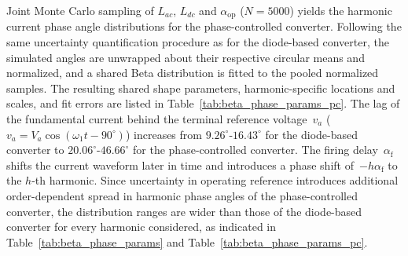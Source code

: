 Joint Monte Carlo sampling of $L_{ac}$, $L_{dc}$ and $\alpha_{\text{op}}$ ($N = 5000$) yields the harmonic current phase angle distributions for the phase-controlled converter. Following the same uncertainty quantification procedure as for the diode-based converter, the simulated angles are unwrapped about their respective circular means and normalized, and a shared Beta distribution is fitted to the pooled normalized samples. The resulting shared shape parameters, harmonic-specific locations and scales, and fit errors are listed in Table~\ref{tab:beta_phase_params_pc}.
The lag of the fundamental current behind the terminal reference voltage~$v_a$ ($v_a = V_a\cos(\omega_1 t - 90^{\circ})$) increases from $9.26^{\circ}$-$16.43^{\circ}$ for the diode-based converter to $20.06^{\circ}$-$46.66^{\circ}$ for the phase-controlled converter. The firing delay~$\alpha_{\text{f}}$ shifts the current waveform later in time and introduces a phase shift of~$-h\alpha_{\text{f}}$ to the $h$-th harmonic. Since uncertainty in operating reference introduces additional order-dependent spread in harmonic phase angles of the phase-controlled converter, the distribution ranges are wider than those of the diode-based converter for every harmonic considered, as indicated in Table~\ref{tab:beta_phase_params} and Table~\ref{tab:beta_phase_params_pc}.




